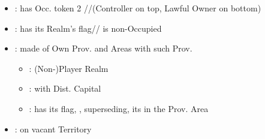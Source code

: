 \documentclass[10pt]{article}
\begin{document}
\begin{itemize}
	\item {}: has Occ. token  2 \rebel/\town/\vassal (Controller on top, Lawful Owner on bottom)
	\item {}: has its Realm's flag/\town/\dnpr {} is non-Occupied
	\item {}: made of Own Prov. and Areas with such Prov.
	\begin{itemize}
		\item {}: (Non-)Player Realm
		\item {}: with Dist. Capital
		\item {}: has its flag, , superseding, its \core in the Prov. Area
	\end{itemize}
	\item {}: \claim on vacant Territory
\end{itemize}
\end{document}
